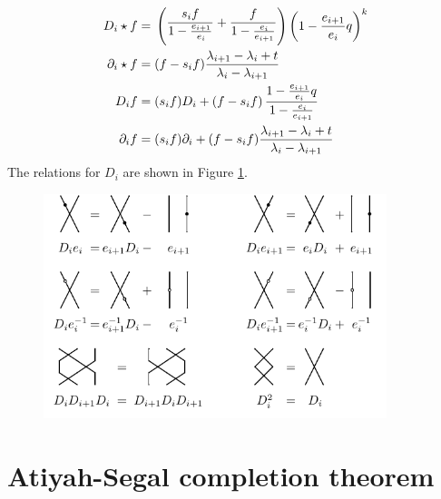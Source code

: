 \documentclass[reqno,11pt]{book}
\numberwithin{equation}{section}
\theoremstyle{plain}
\theoremstyle{plain}
\numberwithin{equation}{section}
\theoremstyle{remark}
\begin{document}
\begin{equation*}
\begin{aligned}
  D_i \star f=\;&
  \left( \raisebox{1mm}{$\displaystyle\frac{s_i f}{ 1-\frac{e_{i+1}}{e_{i}}}     + \frac{f}{1-\frac{e_{i}}{e_{i+1}}}$}  \right)\left(\displaystyle 1-\frac{e_{i+1}}{e_{i}} q\right)^{k} \\
  \partial_i \star f =\;& (f -s_i f) \frac{\lambda_{i+1}-\lambda_{i}+t}{\lambda_{i}-\lambda_{i+1}}\\
  D_i f =\;& (s_i f) D_i + \left(f-s_i f\right) \displaystyle\frac{ 1-\frac{e_{i+1}}{e_{i}} q}{ 1-\frac{e_{i}}{e_{i+1}}}\\ 
  \partial_i f =\;& (s_i f) \partial_i + (f-s_i f) \frac{\lambda_{i+1}-\lambda_{i}+t}{\lambda_{i}-\lambda_{i+1}}\\   
\end{aligned}
\end{equation*}
The relations for $D_i$ are shown in Figure \ref{fig:relations_4}.
\begin{figure}[ht]
  \vspace{0cm}
    \centering  
    \includegraphics[width=10cm]{figures/strands/relations_1.pdf}
    \caption{}
      \label{fig:relations_4}        
\end{figure}
\section{Atiyah-Segal completion theorem}\label{sec:AScompletion}




\end{document}

